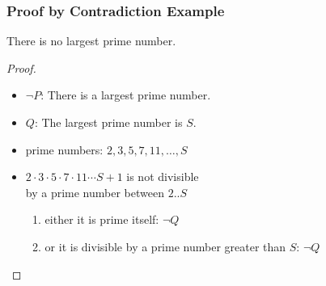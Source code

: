 \documentclass[dvipsnames]{beamer}
\begin{document}
\begin{frame}
  \frametitle{Proof by Contradiction Example}

  \begin{theorem}
    There is no largest prime number.
  \end{theorem}

  \pause
  \begin{proof}
    \begin{itemize}
      \item $\neg P$: There is a largest prime number.

      \pause
      \item $Q$: The largest prime number is $S$.

      \pause
      \item prime numbers: $2,3,5,7,11,\dots,S$

      \pause
      \item $2 \cdot 3 \cdot 5 \cdot 7 \cdot 11 \cdots S + 1$ is not divisible\\
        by a prime number between $2..S$
      \pause
      \begin{enumerate}
        \item either it is prime itself: $\neg Q$

        \pause
        \item or it is divisible by a prime number greater than $S$: $\neg Q$
      \end{enumerate}
    \end{itemize}
  \end{proof}
\end{frame}
\end{document}
